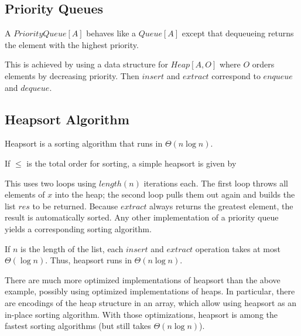 \subsection{Priority Queues}\label{sec:ad:heapqueue}

A $PriorityQueue[A]$ behaves like a $Queue[A]$ except that dequeueing returns the element with the highest priority.

This is achieved by using a data structure for $Heap[A,O]$ where $O$ orders elements by decreasing priority.
Then $insert$ and $extract$ correspond to $enqueue$ and $dequeue$.

\subsection{Heapsort Algorithm}\label{sec:ad:heapsort}

Heapsort is a sorting algorithm that runs in $\Theta(n\log n)$.

If $\leq$ is the total order for sorting, a simple heapsort is given by
\begin{acode}
\end{acode}

This uses two loops using $length(n)$ iterations each.
The first loop throws all elements of $x$ into the heap; the second loop pulls them out again and builds the list $res$ to be returned.
Because $extract$ always returns the greatest element, the result is automatically sorted.
Any other implementation of a priority queue yields a corresponding sorting algorithm.

If $n$ is the length of the list, each $insert$ and $extract$ operation takes at most $\Theta(\log n)$.
Thus, heapsort runs in $\Theta(n\log n)$.
\medskip

There are much more optimized implementations of heapsort than the above example, possibly using optimized implementations of heaps.
In particular, there are encodings of the heap structure in an array, which allow using heapsort as an in-place sorting algorithm.
With those optimizations, heapsort is among the fastest sorting algorithms (but still takes $\Theta(n\log n)$).